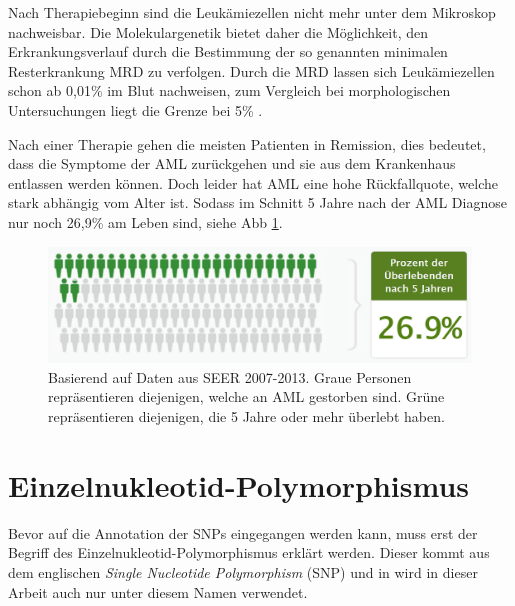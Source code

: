 Nach Therapiebeginn sind die Leukämiezellen nicht mehr unter dem Mikroskop nachweisbar. Die Molekulargenetik bietet daher die Möglichkeit, den Erkrankungsverlauf durch die Bestimmung der so genannten minimalen Resterkrankung \ac{MRD} zu verfolgen. Durch die \ac{MRD} lassen sich Leukämiezellen schon ab 0,01\% im Blut nachweisen, zum Vergleich bei morphologischen Untersuchungen liegt die Grenze bei 5\% \cite{Ossenkoppele.2016}.

Nach einer Therapie gehen die meisten Patienten in Remission, dies bedeutet, dass die Symptome der \ac{AML} zurückgehen und sie aus dem Krankenhaus entlassen werden können. Doch leider hat \ac{AML} eine hohe Rückfallquote, welche stark abhängig vom Alter ist. Sodass im Schnitt 5 Jahre nach der \ac{AML} Diagnose nur noch 26,9\% am Leben sind, siehe \ac{Abb} \ref{fig:seer_aml_rate}.

\begin{figure}
    \centering
    \includegraphics[width=.95\textwidth]{images/SEER_survival_rate_AML.png}
    \caption{Basierend auf Daten aus SEER 2007-2013. Graue Personen repräsentieren diejenigen, welche an \ac{AML} gestorben sind. Grüne repräsentieren diejenigen, die 5 Jahre oder mehr überlebt haben\protect\footnotemark{}.}
    \label{fig:seer_aml_rate}
\end{figure}



\section{Einzelnukleotid-Polymorphismus}
\label{sec:snp_exp}

Bevor auf die Annotation der \ac{SNP}s eingegangen werden kann, muss erst der Begriff des Einzelnukleotid-Polymorphismus erklärt werden. Dieser kommt aus dem englischen \emph{Single Nucleotide Polymorphism} (SNP) und in wird in dieser Arbeit auch nur unter diesem Namen verwendet.

